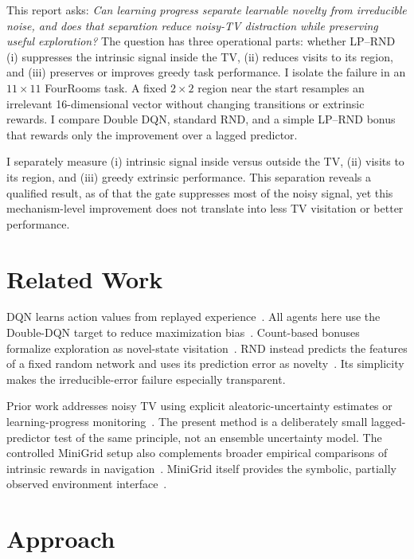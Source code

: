 \documentclass{article}
\newcommand{\lprnd}{LP--RND}
\begin{document}
This report asks: \emph{Can learning progress separate learnable novelty from
irreducible noise, and does that separation reduce noisy-TV distraction while
preserving useful exploration?}  The question has three operational parts:
whether \lprnd{} (i) suppresses the intrinsic signal inside the TV, (ii)
reduces visits to its region, and (iii) preserves or improves greedy task
performance.  I isolate the failure in an $11\times11$ FourRooms task. A fixed
$2\times2$ region near the start resamples an irrelevant 16-dimensional
vector without changing transitions or extrinsic rewards.  I compare Double
DQN, standard RND, and a simple \lprnd{} bonus that rewards only the
improvement over a lagged predictor.


I separately measure (i) intrinsic signal inside versus outside the TV,
(ii) visits to its region, and (iii) greedy extrinsic performance.  This
separation reveals a qualified result, as of that the gate suppresses most of the noisy
signal, yet this mechanism-level improvement does not translate into less TV
visitation or better performance.

\section{Related Work}
DQN learns action values from replayed experience~\citep{mnih-nature15}. All
agents here use the Double-DQN target to reduce maximization
bias~\citep{vanhasselt-aaai16}.  Count-based bonuses formalize exploration as
novel-state visitation~\citep{bellemare-nips16}.  RND instead predicts the
features of a fixed random network and uses its prediction error as
novelty~\citep{burda-iclr19}.  Its simplicity makes the irreducible-error
failure especially transparent.

Prior work addresses noisy TV using explicit aleatoric-uncertainty estimates
or learning-progress monitoring~\citep{mavorparker2022noisytv,hou2025beyond}.
The present method is a deliberately small lagged-predictor test of the same
principle, not an ensemble uncertainty model.  The controlled MiniGrid setup
also complements broader empirical comparisons of intrinsic rewards in
navigation~\citep{kayal2025impact}.  MiniGrid itself provides the symbolic,
partially observed environment interface~\citep{minigrid2023}.

\section{Approach}
\end{document}
